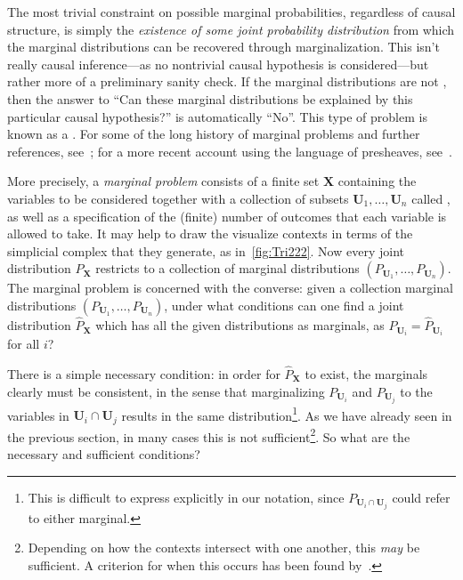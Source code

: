 The most trivial constraint on possible marginal probabilities, regardless of causal structure,  
is simply the \emph{existence of some joint probability distribution} from which the marginal distributions can be recovered through marginalization. This isn't really causal inference---as no nontrivial causal hypothesis is considered---but rather more of a preliminary sanity check. If the marginal distributions are not , then the answer to ``Can these marginal distributions be explained by this particular causal hypothesis?'' is automatically ``No''. This type of problem is known as a . For some of the long history of marginal problems and further references, see~\cite{fritz2013marginal}; for a more recent account using the language of presheaves, see~\cite{abramsky_contextuality_2011}.

More precisely, a \emph{marginal problem} consists of a finite set $\bm{X}$ containing the variables to be considered together with a collection of subsets $\bm{U}_1,\ldots,\bm{U}_n$ called , as well as a specification of the (finite) number of outcomes that each variable is allowed to take. It may help to draw the visualize contexts in terms of the simplicial complex that they generate, as in~\cref{fig:Tri222}. Now every joint distribution $P_{\bm{X}}$ restricts to a collection of marginal distributions $(P_{\bm{U}_1},\ldots,P_{\bm{U}_n})$. The marginal problem is concerned with the converse: given a collection marginal distributions $(P_{\bm{U}_1},\ldots,P_{\bm{U}_n})$, under what conditions can one find a joint distribution $\hat{P}_{\bm{X}}$ which has all the given distributions as marginals, as $P_{\bm{U}_i} = \hat{P}_{\bm{U}_i}$ for all $i$?

There is a simple necessary condition: in order for $\hat{P}_{\bm{X}}$ to exist, the marginals clearly must be consistent, in the sense that marginalizing $P_{\bm{U}_i}$ and $P_{\bm{U}_j}$ to the variables in $\bm{U}_i\cap\bm{U}_j$ results in the same distribution\footnote{This is difficult to express explicitly in our notation, since $P_{\bm{U}_i\cap \bm{U}_j}$ could refer to either marginal.}. As we have already seen in the previous section, in many cases this is not sufficient\footnote{Depending on how the contexts intersect with one another, this \emph{may} be sufficient. A criterion for when this occurs has been found by~\citet{vorobev_extension_1960}.}. So what are the necessary and sufficient conditions?

